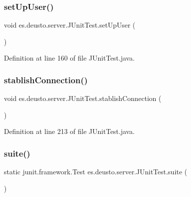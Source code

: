 \subsubsection{\texorpdfstring{set\+Up\+User()}{setUpUser()}}
{\footnotesize\ttfamily void es.\+deusto.\+server.\+J\+Unit\+Test.\+set\+Up\+User (\begin{DoxyParamCaption}{ }\end{DoxyParamCaption})}



Definition at line 160 of file J\+Unit\+Test.\+java.

\mbox{\label{classes_1_1deusto_1_1server_1_1_j_unit_test_a2bdde69e0f41e4977c4ad76fa2cd0b95}} 
\subsubsection{\texorpdfstring{stablish\+Connection()}{stablishConnection()}}
{\footnotesize\ttfamily void es.\+deusto.\+server.\+J\+Unit\+Test.\+stablish\+Connection (\begin{DoxyParamCaption}{ }\end{DoxyParamCaption})}



Definition at line 213 of file J\+Unit\+Test.\+java.

\mbox{\label{classes_1_1deusto_1_1server_1_1_j_unit_test_ae981ce8acebd33a65ebe3160ceeac17b}} 
\subsubsection{\texorpdfstring{suite()}{suite()}}
{\footnotesize\ttfamily static junit.\+framework.\+Test es.\+deusto.\+server.\+J\+Unit\+Test.\+suite (\begin{DoxyParamCaption}{ }\end{DoxyParamCaption})\hspace{0.3cm}{\ttfamily [static]}}



